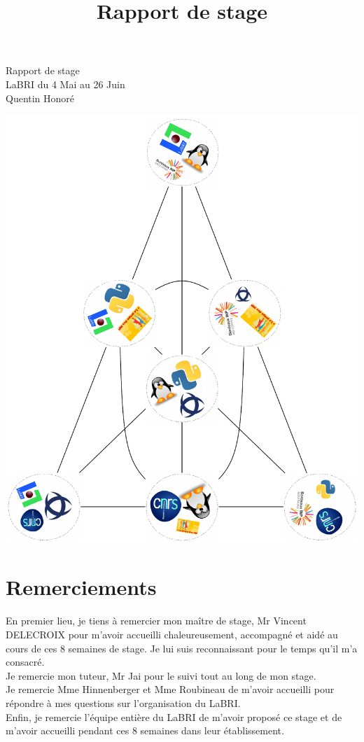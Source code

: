 \documentclass[a4paper]{article}
\title{Rapport de stage}
\begin{document}
\thispagestyle{empty}


\vspace{1cm}
\begin{center}
{\Huge Rapport de stage} \\ \vspace{0.2cm}
{\LARGE LaBRI du 4 Mai au 26 Juin}\\ \vspace{0.3cm}
{\large Quentin Honoré} \\
\end{center}
\hspace{-1.5cm}
\includegraphics[scale = 0.95]{garde.pdf}
\newpage
\thispagestyle{empty}
\strut
\newpage
\tableofcontents
\newpage
\section*{Remerciements}
En premier lieu, je tiens à remercier mon maître de stage, Mr Vincent DELECROIX pour m'avoir accueilli chaleureusement, accompagné et aidé au cours de ces 8 semaines de stage. Je lui suis reconnaissant pour le temps qu'il m'a consacré.\\
Je remercie mon tuteur, Mr Jai pour le suivi tout au long de mon stage.\\
Je remercie Mme Hinnenberger et Mme Roubineau de m'avoir accueilli pour répondre à mes questions sur l'organisation du LaBRI.\\
Enfin, je remercie l'équipe entière du LaBRI de m'avoir proposé ce stage et de m'avoir accueilli pendant ces 8 semaines dans leur établissement.
\newpage
\end{document}
